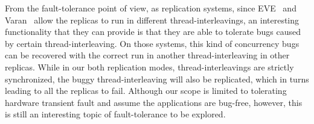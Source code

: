 From the fault-tolerance point of view, as replication systems, since EVE~\cite{kapritsos2012all} and Varan~\cite{hosek2015varan} allow the replicas to run in different thread-interleavings, an interesting functionality that they can provide is that they are able to tolerate bugs caused by certain thread-interleaving. On those systems, this kind of concurrency bugs can be recovered with the correct run in another thread-interleaving in other replicas. While in our both replication modes, thread-interleavings are strictly synchronized, the buggy thread-interleaving will also be replicated, which in turns leading to all the replicas to fail. Although our scope is limited to tolerating hardware transient fault and assume the applications are bug-free, however, this is still an interesting topic of fault-tolerance to be explored.